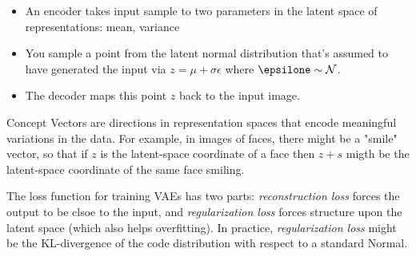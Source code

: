 \begin{itemize}
\item An encoder takes input sample to two parameters in the latent space of representations: mean, variance
\item You sample a point from the latent normal distribution that's assumed to have generated the input via $z = \mu + \sigma \epsilon$ where $\epsilone \sim \mathcal{N}$. 
\item The decoder maps this point $z$ back to the input image. 
\end{itemize} 

\label{Concept Vectors}
Concept Vectors are directions in representation spaces that encode meaningful variations in the data. For example, in images of faces, there might be a "smile" vector, so that if $z$ is the latent-space coordinate of a face then $z+s$ migth be the latent-space coordinate of the same face smiling. 

The loss function for training VAEs has two parts: \textit{reconstruction loss} forces the output to be clsoe to the input, and \textit{regularization loss} forces structure upon the latent space (which also helps overfitting). In practice, \textit{regularization loss} might be the KL-divergence of the code distribution with respect to a standard Normal. 
